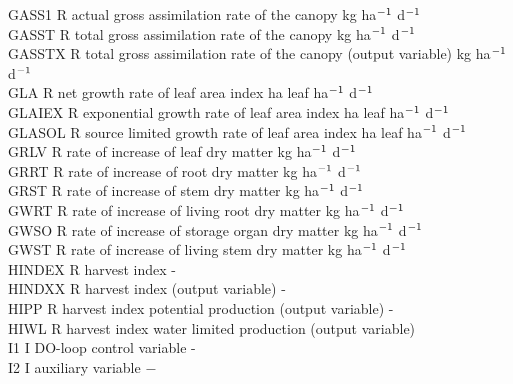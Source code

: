 \documentclass[11pt]{article}
\begin{document}
\begin{tabbing}
GASS1   \> \> R   \> actual gross assimilation rate of the canopy \> \> \> \> \> \> \> kg ha$^{{\rm -1}}$ d$^{{\rm -1}}$\\
GASST\> \> R\> total gross assimilation rate of the canopy \> \> \> \> \> \> \> kg ha$^{{\rm -1}}$ d$^{{\rm -1}}$\\
GASSTX\> \> R\> total gross assimilation rate of the canopy (output variable) \> \> \> \> \> \> \> kg ha$^{{\rm -1}}$ d$^{{\rm -1}}$\\
GLA\> \> R\> net growth rate of leaf area index\> \> \> \> \> \> \> ha leaf ha$^{{\rm -1}}$ d$^{{\rm -1}}$\\
GLAIEX\> \> R\> exponential growth rate of leaf area index\> \> \> \> \> \> \> ha leaf ha$^{{\rm -1}}$ d$^{{\rm -1}}$\\
GLASOL\> \> R\> source limited growth rate of leaf area index\> \> \> \> \> \> \> ha leaf ha$^{{\rm -1}}$ d$^{{\rm -1}}$\\
GRLV    \> \> R   \> rate of increase of leaf dry matter          \> \> \> \> \> \> \> kg ha$^{{\rm -1}}$ d$^{{\rm -1}}$\\
GRRT    \> \> R   \> rate of increase of root dry matter                \> \> \> \> \> \> \> kg ha$^{{\rm -1}}$ d$^{{\rm -1}}$\\
GRST    \> \> R   \> rate of increase of stem dry matter                \> \> \> \> \> \> \> kg ha$^{{\rm -1}}$ d$^{{\rm -1}}$\\
GWRT    \> \> R   \> rate of increase of living root dry matter         \> \> \> \> \> \> \> kg ha$^{{\rm -1}}$ d$^{{\rm -1}}$\\
GWSO    \> \> R   \> rate of increase of storage organ dry matter       \> \> \> \> \> \> \> kg ha$^{{\rm -1}}$ d$^{{\rm -1}}$\\
GWST    \> \> R   \> rate of increase of living stem dry matter         \> \> \> \> \> \> \> kg ha$^{{\rm -1}}$ d$^{{\rm -1}}$\\
HINDEX\> \> R\> harvest index\> \> \> \> \> \> \> -\\
HINDXX\> \> R\> harvest index (output variable)\> \> \> \> \> \> \> -\\
HIPP\> \> R\> harvest index potential production (output variable)\> \> \> \> \> \> \> -\\
HIWL\> \> R\> harvest index water limited production (output variable)\\
I1\> \> I\> DO-loop control variable\> \> \> \> \> \> \> -\\
I2      \> \> I   \> auxiliary variable                                 \> \> \> \> \> \> \> $-$\\

\end{tabbing}
\end{document}
